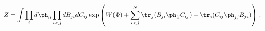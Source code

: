 \begin{equation}
Z = \int \prod_{i}d\ph_{ii} \prod_{i< j}dB_{ji} dC_{ij} \exp\left( W(\Phi) +
\sum_{i< j}^{N} \tr_j( B_{ji}\ph_{ii}C_{ij}) + \tr_i (C_{ij}\ph%
_{jj}B_{ji})\right)\, .
\end{equation}

